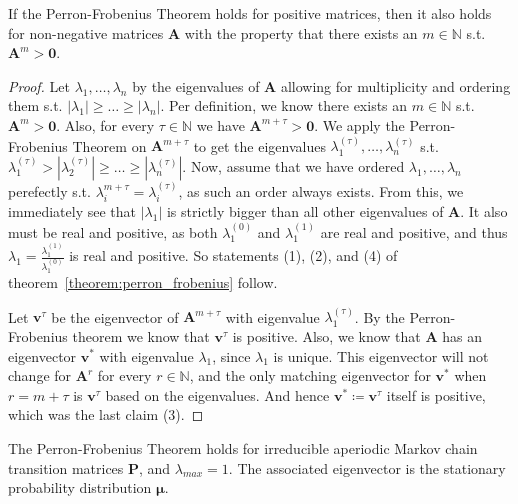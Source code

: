 \documentclass[../../main.tex]{subfiles}
\begin{document}
\begin{lemma}
    If the Perron-Frobenius Theorem holds for positive matrices, then it also holds for non-negative matrices $\bm{A}$ with the property that there exists an $m \in \mathbb{N}$ s.t. $\bm{A}^m > \bm{0}$.
\end{lemma}
\vspace{-2.5em}
\begin{proof}
    Let $\lambda_1, \dots, \lambda_n$ by the eigenvalues of $\bm{A}$ allowing for multiplicity and ordering them s.t. $|\lambda_1| \geq \dots \geq |\lambda_n|$. Per definition, we know there exists an $m \in \mathbb{N}$ s.t. $\bm{A}^m > \bm{0}$. Also, for every $\tau \in \mathbb{N}$ we have $\bm{A}^{m + \tau} > \bm{0}$. We apply the Perron-Frobenius Theorem on $\bm{A}^{m + \tau}$ to get the eigenvalues $\lambda_1^{(\tau)}, \dots, \lambda_n^{(\tau)}$ s.t. $\lambda_1^{(\tau)} > |\lambda_2^{(\tau)}| \geq \dots \geq |\lambda_n^{(\tau)}|$. Now, assume that we have ordered $\lambda_1, \dots, \lambda_n$ perefectly s.t. $\lambda_i^{m + \tau} = \lambda_i^{(\tau)}$, as such an order always exists. From this, we immediately see that $|\lambda_1|$ is strictly bigger than all other eigenvalues of $\bm{A}$. It also must be real and positive, as both $\lambda_1^{(0)}$ and $\lambda_1^{(1)}$ are real and positive, and thus $\lambda_1 = \frac{\lambda_1^{(1)}}{\lambda_1^{(0)}}$ is real and positive. So statements (1), (2), and (4) of theorem~\ref{theorem:perron_frobenius} follow.

    Let $\bm{v}^{\tau}$ be the eigenvector of $\bm{A}^{m + \tau}$ with eigenvalue $\lambda_1^{(\tau)}$. By the Perron-Frobenius theorem we know that $\bm{v}^{\tau}$ is positive. Also, we know that $\bm{A}$ has an eigenvector $\bm{v}^*$ with eigenvalue $\lambda_1$, since $\lambda_1$ is unique. This eigenvector will not change for $\bm{A}^r$ for every $r \in \mathbb{N}$, and the only matching eigenvector for $\bm{v}^*$ when $r = m + \tau$ is $\bm{v}^{\tau}$ based on the eigenvalues. And hence $\bm{v}^* \coloneqq \bm{v}^{\tau}$ itself is positive, which was the last claim (3).
\end{proof}

\begin{corollary}
    The Perron-Frobenius Theorem holds for irreducible aperiodic Markov chain transition matrices $\bm{P}$, and $\lambda_{max} = 1$. The associated eigenvector is the stationary probability distribution $\bm{\mu}$.
\end{corollary}
\end{document}
